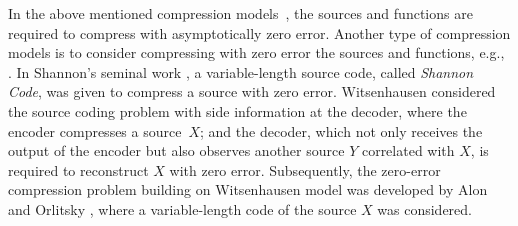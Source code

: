 \documentclass[11pt,draftclsnofoot,onecolumn]{IEEEtran}
\makeatletter
\newcommand{\Rmnum}[1]{\expandafter\@slowromancap\romannumeral #1@}
\makeatother
\begin{document}
In the above mentioned compression models~\cite{Shannon48,Slepian-Wolf-IT73,Korner-Marton-IT73,Doshi_fun_comp_graph_color_sch,
Feizi-Medard,Orlitsky-Roche_general_side_inf_model_rat_reg}, the sources and functions are required to compress with asymptotically zero error. Another type of compression models is to consider compressing with zero error the sources and functions, e.g., \cite{Shannon48,Witsenhausen-IT-76,Alon-Orlitsky_source_cod_graph_entropies,Koulgi_zero-error-cod_cor_inf_sour}. In Shannon's seminal work \cite{Shannon48}, a variable-length source code, called {\em Shannon Code}, was given to compress a source with zero error. Witsenhausen \cite{Witsenhausen-IT-76} considered the  source coding problem with side information at the decoder, where the encoder compresses a source~$X$; and the decoder, which not only receives the output of the encoder but also observes another source  $Y$ correlated with $X$, is required to reconstruct $X$ with zero error. Subsequently, the zero-error compression problem building on Witsenhausen model was developed by Alon and Orlitsky \cite{Alon-Orlitsky_source_cod_graph_entropies}, where a variable-length code of the source $X$ was considered.
\end{document}
